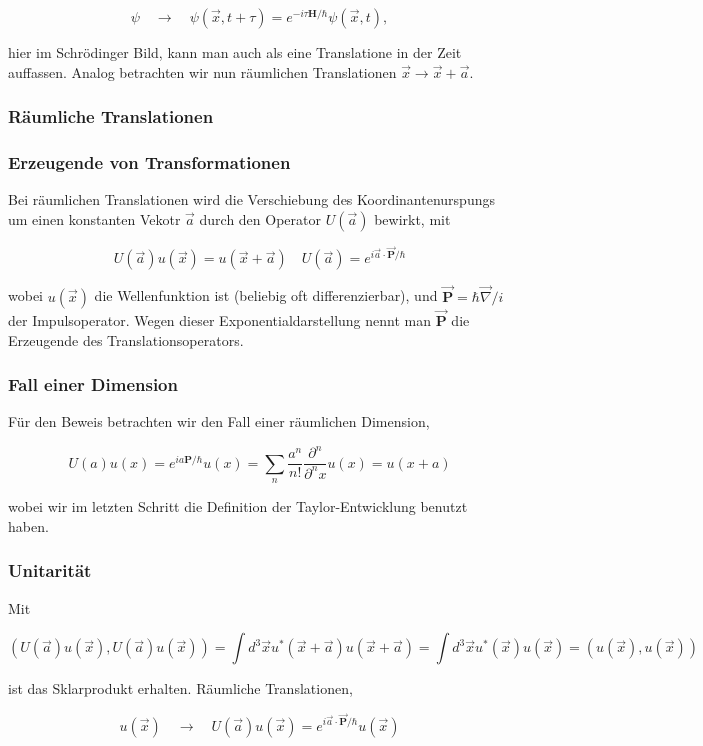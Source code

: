 \documentclass[10pt, letterpaper]{article}
\begin{document}
$$
\psi \quad \rightarrow \quad \psi(\vec{x}, t+\tau)=e^{-i \tau \mathbf{H} / \hbar} \psi(\vec{x}, t),
$$

hier im Schrödinger Bild, kann man auch als eine Translatione in der Zeit auffassen. Analog betrachten wir nun räumlichen Translationen $\vec{x} \rightarrow \vec{x}+\vec{a}$.

\subsubsection*{Räumliche Translationen}
\subsubsection*{Erzeugende von Transformationen}
Bei räumlichen Translationen wird die Verschiebung des Koordinantenurspungs um einen konstanten Vekotr $\vec{a}$ durch den Operator $U(\vec{a})$ bewirkt, mit

$$
U(\vec{a}) u(\vec{x})=u(\vec{x}+\vec{a}) \quad U(\vec{a})=e^{i \vec{a} \cdot \overrightarrow{\mathbf{P}} / \hbar}
$$

wobei $u(\vec{x})$ die Wellenfunktion ist (beliebig oft differenzierbar), und $\overrightarrow{\mathbf{P}}=\hbar \vec{\nabla} / i$ der Impulsoperator. Wegen dieser Exponentialdarstellung nennt man $\overrightarrow{\mathbf{P}}$ die Erzeugende des Translationsoperators.

\subsubsection*{Fall einer Dimension}
Für den Beweis betrachten wir den Fall einer räumlichen Dimension,

$$
U(a) u(x)=e^{i a \mathbf{P} / \hbar} u(x)=\sum_{n} \frac{a^{n}}{n!} \frac{\partial^{n}}{\partial^{n} x} u(x)=u(x+a)
$$

wobei wir im letzten Schritt die Definition der Taylor-Entwicklung benutzt haben.

\subsubsection*{Unitarität}
Mit

$$
(U(\vec{a}) u(\vec{x}), U(\vec{a}) u(\vec{x}))=\int d^{3} \vec{x} u^{*}(\vec{x}+\vec{a}) u(\vec{x}+\vec{a})=\int d^{3} \vec{x} u^{*}(\vec{x}) u(\vec{x})=(u(\vec{x}), u(\vec{x}))
$$

ist das Sklarprodukt erhalten. Räumliche Translationen,

$$
u(\vec{x}) \quad \rightarrow \quad U(\vec{a}) u(\vec{x})=e^{i \vec{a} \cdot \overrightarrow{\mathbf{P}} / \hbar} u(\vec{x})
$$
\end{document}
